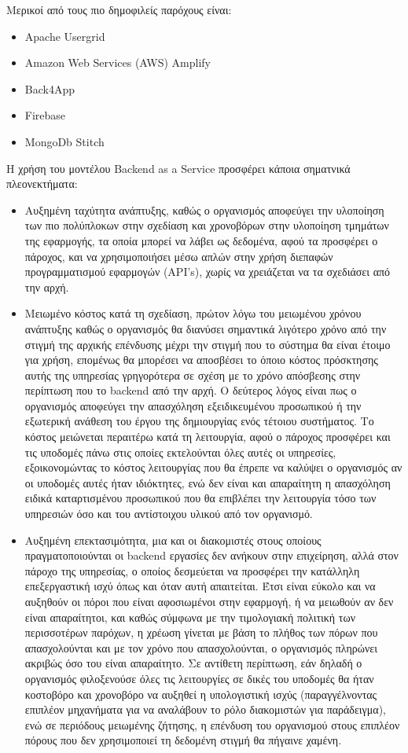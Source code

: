 \documentclass{article}
\begin{document}
Μερικοί από τους πιο δημοφιλείς παρόχους είναι:
\begin{itemize}
\item Apache Usergrid
\item Amazon Web Services (AWS) Amplify
\item Back4App
\item Firebase
\item MongoDb Stitch
\end{itemize}
Η χρήση του μοντέλου Backend as a Service προσφέρει κάποια σηματνικά πλεονεκτήματα:
\begin{itemize}
\item Αυξημένη ταχύτητα ανάπτυξης, καθώς ο οργανισμός αποφεύγει την υλοποίηση των πιο πολύπλοκων στην σχεδίαση και χρονοβόρων στην υλοποίηση τμημάτων της εφαρμογής, τα οποία μπορεί να λάβει ως δεδομένα, αφού τα προσφέρει ο πάροχος, και να χρησιμοποιήσει μέσω απλών στην χρήση διεπαφών προγραμματισμού εφαρμογών (API’s), χωρίς να χρειάζεται να τα σχεδιάσει από την αρχή.
\item Μειωμένο κόστος κατά τη σχεδίαση, πρώτον λόγω του μειωμένου χρόνου ανάπτυξης καθώς ο οργανισμός θα διανύσει σημαντικά λιγότερο χρόνο από την στιγμή της αρχικής επένδυσης μέχρι την στιγμή που το σύστημα θα είναι έτοιμο για χρήση, επομένως θα μπορέσει να αποσβέσει το όποιο κόστος πρόσκτησης αυτής της υπηρεσίας γρηγορότερα σε σχέση με το χρόνο απόσβεσης στην περίπτωση που το backend από την αρχή. Ο δεύτερος λόγος είναι πως ο οργανισμός αποφεύγει την απασχόληση εξειδικευμένου προσωπικού ή την εξωτερική ανάθεση του έργου της δημιουργίας ενός τέτοιου συστήματος. Το κόστος μειώνεται περαιτέρω κατά τη λειτουργία, αφού ο πάροχος προσφέρει και τις υποδομές πάνω στις οποίες εκτελούνται όλες αυτές οι υπηρεσίες, εξοικονομώντας το κόστος λειτουργίας που θα έπρεπε να καλύψει ο οργανισμός αν οι υποδομές αυτές ήταν ιδιόκτητες, ενώ δεν είναι και απαραίτητη η απασχόληση ειδικά καταρτισμένου προσωπικού που θα επιβλέπει την λειτουργία τόσο των υπηρεσιών όσο και του αντίστοιχου υλικού από τον οργανισμό.
\item Αυξημένη επεκτασιμότητα, μια και οι διακομιστές στους οποίους πραγματοποιούνται οι backend εργασίες δεν ανήκουν στην επιχείρηση, αλλά στον πάροχο της υπηρεσίας, ο οποίος δεσμεύεται να προσφέρει την κατάλληλη επεξεργαστική ισχύ όπως και όταν αυτή απαιτείται. Έτσι είναι εύκολο και να αυξηθούν οι πόροι που είναι αφοσιωμένοι στην εφαρμογή, ή να μειωθούν αν δεν είναι απαραίτητοι, και καθώς σύμφωνα με την τιμολογιακή πολιτική των περισσοτέρων παρόχων, η χρέωση γίνεται με βάση το πλήθος των πόρων που απασχολούνται και με τον χρόνο που απασχολούνται, ο οργανισμός πληρώνει ακριβώς όσο του είναι απαραίτητο. Σε αντίθετη περίπτωση, εάν δηλαδή ο οργανισμός φιλοξενούσε όλες τις λειτουργίες σε δικές του υποδομές θα ήταν κοστοβόρο και χρονοβόρο να αυξηθεί η υπολογιστική ισχύς (παραγγέλνοντας επιπλέον μηχανήματα για να αναλάβουν το ρόλο διακομιστών για παράδειγμα), ενώ σε περιόδους μειωμένης ζήτησης, η επένδυση του οργανισμού στους επιπλέον πόρους που δεν χρησιμοποιεί τη δεδομένη στιγμή θα πήγαινε χαμένη.

\end{itemize}
\end{document}

